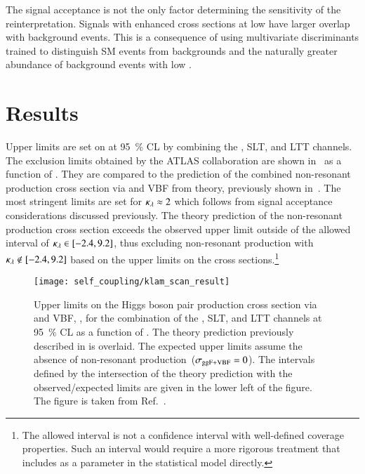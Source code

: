 The signal acceptance is not the only factor determining the
sensitivity of the reinterpretation. Signals with enhanced cross
sections at low \mHH have larger overlap with background events. This
is a consequence of using multivariate discriminants trained to
distinguish SM \HH events from backgrounds and the naturally greater
abundance of background events with low \mHH.


\section{Results}%
\label{sec:reinterpretation_results}

Upper limits are set on \xsecggfvbf at \SI{95}{\percent} CL by
combining the \hadhad, \lephad SLT, and \lephad LTT channels. The
exclusion limits obtained by the ATLAS collaboration are shown
in~ as a function of \klambda. They are
compared to the prediction of the combined non-resonant \HH production
cross section via \ggF and VBF from theory, previously shown
in~. The most stringent limits are set for
$\kappa_{\lambda} \approx 2$ which follows from signal acceptance
considerations discussed previously. The theory prediction of the
non-resonant \HH production cross section exceeds the observed upper
limit outside of the allowed interval of
\mbox{$\kappa_{\lambda} \in [-2.4, 9.2]$}, thus excluding non-resonant \HH
production with \mbox{$\kappa_{\lambda} \notin [-2.4, 9.2]$} based on the
upper limits on the cross sections.\footnote{The allowed \klambda
  interval is not a confidence interval with well-defined coverage
  properties. Such an interval would require a more rigorous treatment
  that includes \klambda as a parameter in the statistical model
  directly.}

\begin{figure}[htbp]
  \centering

  \texttt{[image: self\_coupling/klam\_scan\_result]}

  \caption{Upper limits on the Higgs boson pair production cross
    section via \ggF and VBF, \xsecggfvbf, for the combination of the
    \hadhad, \lephad SLT, and \lephad LTT channels at
    \SI{95}{\percent} CL as a function of \klambda. The theory
    prediction previously described in  is
    overlaid. The expected upper limits assume the absence of
    non-resonant \HH production~($\sigma_{\text{ggF+VBF}} = 0$). The \klambda
    intervals defined by the intersection of the theory prediction
    with the observed/expected limits are given in the lower left of
    the figure. The figure is taken from
    Ref.~\cite{ATLAS-CONF-2021-052}.}%
  \label{fig:klambda_scan}
\end{figure}

